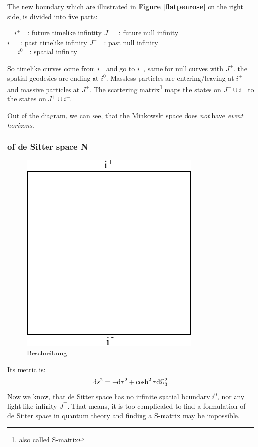 	The new boundary which are illustrated in \textbf{Figure \ref{flatpenrose}} on the right side, is divided into five parts:	
		\begin{tabbing}
			\hspace{0.1\linewidth} \= \hspace{0.4\linewidth} \= \hspace{0.1\linewidth} \= \hfill \kill
			$i^+$~~: \> future timelike infintity\> $J^+$~~: \> future null infinity \\
			$i^-$~~: \> past timelike infinity \> $J^-$~~: \> past null infinity\\
			\hspace{0.35\linewidth} \= \hspace{0.1\linewidth} \= \hfill \kill	
			~ \> $i^0$~~: \> spatial infinity 
		\end{tabbing}
	So timelike curves come from $i^-$ and go to $i^+$, same for null curves with $J^\mp$, the spatial geodesics are ending at $i^0$. Massless particles are entering/leaving at $i^\mp$ and massive particles at $J^\mp$. The scattering matrix\footnote{also called S-matrix} maps the states on $J^- \cup i^-$ to the states on $J^+ \cup i^+$.	
	
	Out of the diagram, we can see, that the Minkowski space does \textit{not} have \textit{event horizons}.
	
	\subsubsection{of de Sitter space \textbf{N}}
	\begin{figure}[tbp]
	 	\begin{center}
			\includegraphics[scale=0.8]{dspenrose}
		\end{center}
	  		\caption{Beschreibung}\label{dspenrose}
	\end{figure}
	Its metric is:
		\begin{equation}
			\mathrm{d} s^2=- \mathrm{d} \tau^2+\cosh^2\tau \mathrm{d} \Omega^2_3
		\end{equation}
		Now we know, that de Sitter space has no infinite spatial boundary $i^0$, nor any light-like infinity $J^\mp$. That means, it is too complicated to find a formulation of de Sitter space in quantum theory and finding a S-matrix may be impossible. 
		

